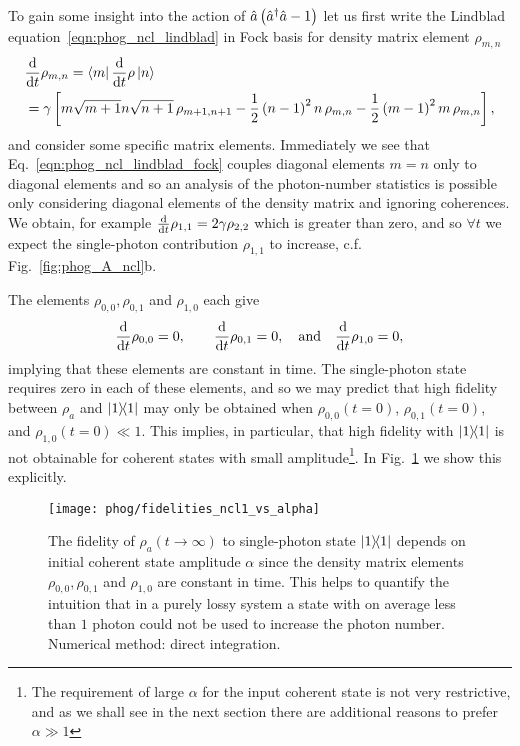 To gain some insight into the action of $\hat{a}\left(\hat{a}^\dagger \hat{a} - 1\right)$ let us first write the Lindblad equation~\ref{eqn:phog_ncl_lindblad} in Fock basis for density matrix element $\rho_{m, n}$
\begin{align}\label{eqn:phog_ncl_lindblad_fock}
&\ddt \rho_{m, n} = \bra{m} \ddt \rho \ket{n} \notag  \\
%
&= \gamma \left[ m \sqrt{m+1} n \sqrt{n+1} \, \rho_{m+1, n+1} - \frac{1}{2} \left(n-1\right)^2 n\, \rho_{m, n} - \frac{1}{2} \left(m-1\right)^2 m\, \rho_{m, n}\right],
\end{align}
and consider some specific matrix elements. Immediately we see that Eq.~\ref{eqn:phog_ncl_lindblad_fock} couples diagonal elements $m=n$ only to diagonal elements and so an analysis of the photon-number statistics is possible only considering diagonal elements of the density matrix and ignoring coherences. We obtain, for example $\frac{\mathrm{d}}{\mathrm{d}t} \rho_{1, 1}=2 \gamma \rho_{2, 2}$ which is greater than zero, and so $\forall t$ we expect the single-photon contribution $\rho_{1,1}$ to increase, c.f. Fig.~\ref{fig:phog_A_ncl}b. 

\noindent The elements $\rho_{0, 0}, \rho_{0, 1}$ and $\rho_{1, 0}$ each give
\begin{equation}
\ddt \rho_{0,0} = 0, \qq{} \ddt \rho_{0, 1} = 0, \qq{and} \ddt\rho_{1, 0} = 0,
\end{equation}
implying that these elements are constant in time. The single-photon state requires zero in each of these elements, and so we may predict that high fidelity between $\rho_a$ and $\dyad{1}$ may only be obtained when $\rho_{0,0}\left(t=0\right)$, $\rho_{0, 1}\left(t=0\right)$, and $\rho_{1, 0}\left(t=0\right) \ll 1$. This implies, in particular, that high fidelity with $\dyad{1}$ is not obtainable for coherent states with small amplitude\footnote{The requirement of large $\alpha$ for the input coherent state is not very restrictive, and as we shall see in the next section there are additional reasons to prefer $\alpha \gg 1$}. In Fig.~\ref{fig:phog_fidelity_ncl_vs_alpha} we show this explicitly.

\begin{figure}[htp]
\centering
\texttt{[image: phog/fidelities\_ncl1\_vs\_alpha]}
\caption{\label{fig:phog_fidelity_ncl_vs_alpha} The fidelity of $\rho_a\left(t\rightarrow\infty\right)$ to single-photon state $\dyad{1}$ depends on initial coherent state amplitude $\alpha$ since the density matrix elements $\rho_{0, 0}, \rho_{0, 1}$ and $\rho_{1, 0}$ are constant in time. This helps to quantify the intuition that in a purely lossy system a state with on average less than $1$ photon could not be used to increase the photon number. Numerical method: direct integration.}
\end{figure}




